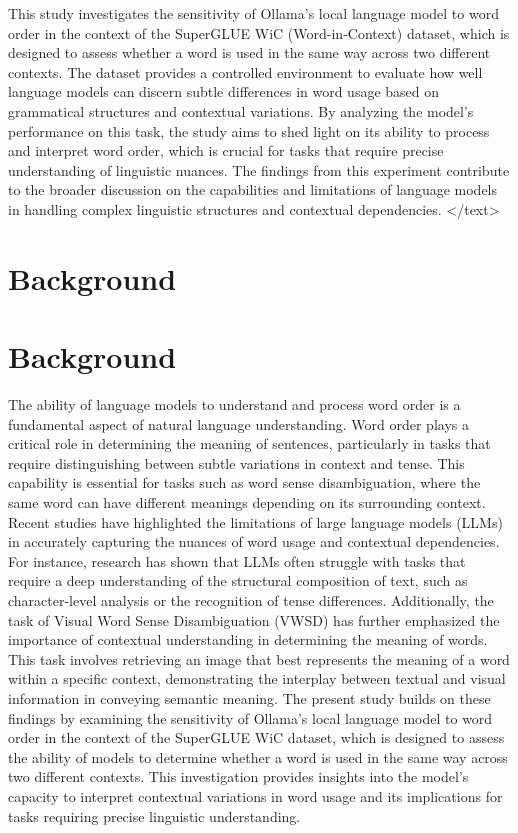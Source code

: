 \documentclass{article}
\begin{document}
This study investigates the sensitivity of Ollama's local language model to word order in the context of the SuperGLUE WiC (Word-in-Context) dataset, which is designed to assess whether a word is used in the same way across two different contexts. The dataset provides a controlled environment to evaluate how well language models can discern subtle differences in word usage based on grammatical structures and contextual variations. By analyzing the model's performance on this task, the study aims to shed light on its ability to process and interpret word order, which is crucial for tasks that require precise understanding of linguistic nuances. The findings from this experiment contribute to the broader discussion on the capabilities and limitations of language models in handling complex linguistic structures and contextual dependencies.
</text>
\section{Background}
\section{Background}

The ability of language models to understand and process word order is a fundamental aspect of natural language understanding. Word order plays a critical role in determining the meaning of sentences, particularly in tasks that require distinguishing between subtle variations in context and tense. This capability is essential for tasks such as word sense disambiguation, where the same word can have different meanings depending on its surrounding context. Recent studies have highlighted the limitations of large language models (LLMs) in accurately capturing the nuances of word usage and contextual dependencies. For instance, research has shown that LLMs often struggle with tasks that require a deep understanding of the structural composition of text, such as character-level analysis or the recognition of tense differences. Additionally, the task of Visual Word Sense Disambiguation (VWSD) has further emphasized the importance of contextual understanding in determining the meaning of words. This task involves retrieving an image that best represents the meaning of a word within a specific context, demonstrating the interplay between textual and visual information in conveying semantic meaning. The present study builds on these findings by examining the sensitivity of Ollama's local language model to word order in the context of the SuperGLUE WiC dataset, which is designed to assess the ability of models to determine whether a word is used in the same way across two different contexts. This investigation provides insights into the model's capacity to interpret contextual variations in word usage and its implications for tasks requiring precise linguistic understanding.
\end{document}
